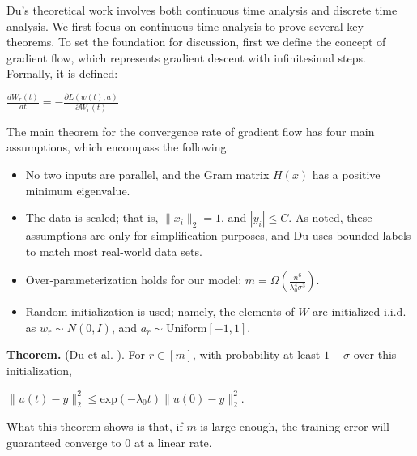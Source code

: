 \documentclass{article}
\begin{document}
Du's theoretical work involves both continuous time analysis and discrete time analysis. We first focus on continuous time analysis to prove several key theorems. To set the foundation for discussion, first we define the concept of gradient flow, which represents gradient descent with infinitesimal steps. Formally, it is defined:
\begin{center}
    $\frac{d W_r(t)}{dt} = -\frac{\partial L(w(t),a)}{\partial W_r(t)}$
\end{center}

The main theorem for the convergence rate of gradient flow has four main assumptions, which encompass the following.
\begin{itemize}
\item No two inputs are parallel, and the Gram matrix $H(x)$ has a positive minimum eigenvalue.
\item The data is scaled; that is, $\|x_i\|_{2} = 1$, and $|y_i|\leq C$. As noted, these assumptions are only for simplification purposes, and Du uses bounded labels to match most real-world data sets.  
\item Over-parameterization holds for our model: $m=\Omega(\frac{n^6}{\lambda^4_0 \sigma^3})$.
\item Random initialization is used; namely, the elements of $W$ are initialized i.i.d. as $w_r\sim N(0,I)$, and $a_r \sim \text{Uniform}[{-1,1}]$.
\end{itemize}

\textbf{Theorem.} (Du et al. \cite{SimonDu}). For $r \in [m]$, with probability at least $1-\sigma$ over this initialization,
\begin{center}
    $\|u(t)-y\|^2_2 \leq \text{exp}(-\lambda_0 t)\|u(0)-y\|^2_2$.
\end{center}

What this theorem shows is that, if $m$ is large enough, the training error will guaranteed converge to 0 at a linear rate. 
\end{document}
